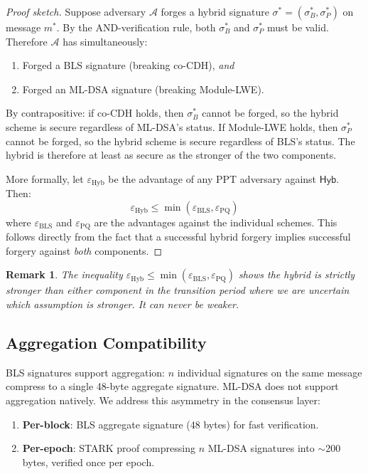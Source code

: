 \documentclass[11pt,a4paper]{article}
\newtheorem{remark}{Remark}[section]
\begin{document}
\begin{proof}[Proof sketch]
Suppose adversary $\mathcal{A}$ forges a hybrid signature $\sigma^* = (\sigma_B^*,
\sigma_P^*)$ on message $m^*$. By the AND-verification rule, both $\sigma_B^*$ and
$\sigma_P^*$ must be valid. Therefore $\mathcal{A}$ has simultaneously:
\begin{enumerate}
  \item Forged a BLS signature (breaking co-CDH), \emph{and}
  \item Forged an ML-DSA signature (breaking Module-LWE).
\end{enumerate}

By contrapositive: if co-CDH holds, then $\sigma_B^*$ cannot be forged, so the
hybrid scheme is secure regardless of ML-DSA's status. If Module-LWE holds, then
$\sigma_P^*$ cannot be forged, so the hybrid scheme is secure regardless of BLS's
status. The hybrid is therefore at least as secure as the stronger of the two
components.

More formally, let $\varepsilon_{\text{Hyb}}$ be the advantage of any PPT adversary
against $\textsf{Hyb}$. Then:
\[
  \varepsilon_{\text{Hyb}} \leq \min(\varepsilon_{\text{BLS}}, \varepsilon_{\text{PQ}})
\]
where $\varepsilon_{\text{BLS}}$ and $\varepsilon_{\text{PQ}}$ are the advantages
against the individual schemes. This follows directly from the fact that a successful
hybrid forgery implies successful forgery against \emph{both} components.
\end{proof}

\begin{remark}
The inequality $\varepsilon_{\text{Hyb}} \leq \min(\varepsilon_{\text{BLS}},
\varepsilon_{\text{PQ}})$ shows the hybrid is \emph{strictly stronger} than either
component in the transition period where we are uncertain which assumption is
stronger. It can never be weaker.
\end{remark}

\subsection{Aggregation Compatibility}

BLS signatures support aggregation: $n$ individual signatures on the same message
compress to a single 48-byte aggregate signature. ML-DSA does not support aggregation
natively. We address this asymmetry in the consensus layer:

\begin{enumerate}[leftmargin=2em]
  \item \textbf{Per-block}: BLS aggregate signature (48 bytes) for fast verification.
  \item \textbf{Per-epoch}: STARK proof compressing $n$ ML-DSA signatures into
        $\sim$200 bytes, verified once per epoch.
\end{enumerate}
\end{document}
